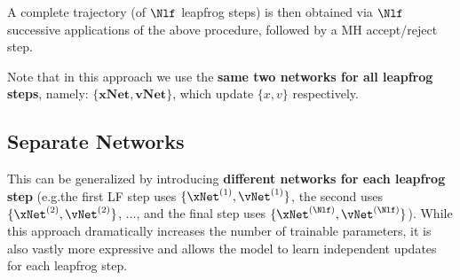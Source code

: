 A complete trajectory (of \(\Nlf\) leapfrog steps) is then obtained via
\(\Nlf\) successive applications of the above procedure, followed by a MH
accept/reject step.

Note that in this approach we use the \textbf{same two networks for all
leapfrog steps}, namely: \(\{\mathrm{\mathbf{xNet}}, \mathrm{\mathbf{vNet}}\}\),
which update \(\{x, v\}\) respectively.
%
\subsection{Separate Networks}%
\label{subsec:separate_networks}
%
This can be generalized by introducing \textbf{different networks for each
leapfrog step} (e.g.\@ the first LF step uses \(\{\xNet^{(1)},
\vNet^{(1)}\}\), the second uses \(\{\xNet^{(2)}, \vNet^{(2)}\}\), \(\ldots\), and
the final step uses \(\{\xNet^{(\Nlf)}, \vNet^{(\Nlf)}\}\)).
%
While this approach dramatically increases the number of trainable parameters,
it is also vastly more expressive and allows the model to learn independent
updates for each leapfrog step.
%
%
%
%
